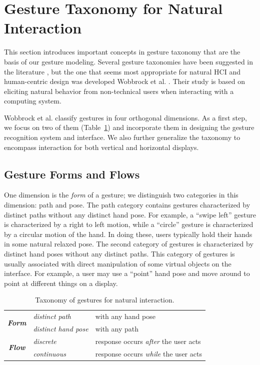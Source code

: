 \documentclass[conference]{IEEEtran}
\begin{document}
\section{Gesture Taxonomy for Natural Interaction}\label{sec:taxonomy}
This section introduces important
concepts in gesture taxonomy that are the basis of our gesture modeling.
Several gesture taxonomies have been suggested in the literature
\cite{kendon86, Pavlovic97}, but the one that seems most appropriate for natural
HCI and human-centric design was developed Wobbrock et al. \cite{wobbrock09}. Their
study is based on eliciting natural behavior from non-technical users when
interacting with a computing system. 

Wobbrock et al. classify gestures in four orthogonal dimensions. As a first
step, we focus on two of them (Table~\ref{tab:taxonomy}) and incorporate them in
designing the gesture recognition system and interface. We also further generalize the
taxonomy to encompass interaction for both vertical and horizontal displays.

\subsection{Gesture Forms and Flows}
One dimension is the \textit{form} of a gesture; we distinguish two
categories in this dimension: path and pose. The path category 
contains gestures characterized by distinct paths without any distinct
hand pose. For example, a ``swipe left'' gesture is characterized by a
right to left motion, while a ``circle'' gesture is characterized by a
circular motion of the hand. In doing these, users typically hold their
hands in some natural relaxed pose. The second category of gestures is
characterized by distinct hand poses without any distinct paths. This category
of gestures is usually associated with direct manipulation of some virtual
objects on the interface.
For example, a user may use a ``point'' hand pose and move around to
point at different things on a display.

\begin{table}[t]
\caption{Taxonomy of gestures for natural interaction.}
\label{tab:taxonomy}
\centering
\begin{tabular}{|c|l|l|}
\hline
\multirow{2}{*}{\textbf{\textit{Form}}} & \textit{distinct path} & with any hand
pose
\\
\cline{2-3} 
                               & \textit{distinct hand pose} & with any path \\
\hline
\multirow{2}{*}{\textbf{\textit{Flow}}} & \textit{discrete} & response occurs
\textit{after} the user acts \\
\cline{2-3}
              & \textit{continuous} & response occurs \textit{while} the user
              acts \\
\hline
\end{tabular}
\end{table}
\end{document}
